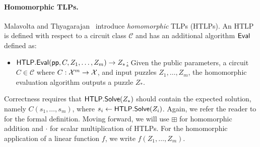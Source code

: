 \paragraph{Homomorphic TLPs.}
Malavolta and Thyagarajan~\cite{C:MalThy19} introduce \emph{homomorphic} TLPs (HTLPs). An HTLP is defined with respect to a circuit class $\mathcal{C}$ and has an additional algorithm $\sf Eval$ defined as:
\begin{itemize}
    \item \underline{$\mathsf{HTLP}.{\sf Eval}(\mathsf{pp}, C, Z_1, \dots, Z_m) \rightarrow Z_*$:} Given the public parameters, a circuit $C \in \mathcal{C}$ where $C: \mathcal{X}^m \rightarrow \mathcal{X}$, and input puzzles $Z_1, \dots, Z_m$, the homomorphic evaluation algorithm outputs a puzzle $Z_*$.
\end{itemize}

Correctness requires that $\mathsf{HTLP}.{\sf Solve}(Z_*)$
should contain the expected solution, namely $C(s_1, \dots, s_m)$, where $s_i \gets \mathsf{HTLP}.{\sf Solve}(Z_i)$. Again, we refer the reader to \cite{C:MalThy19} for the formal definition. Moving forward, we will use $\boxplus$ for homomorphic addition and $\cdot$ for scalar multiplication of HTLPs. For the homomorphic application of a linear function $f$, we write $f(Z_1, \dots, Z_m)$.



